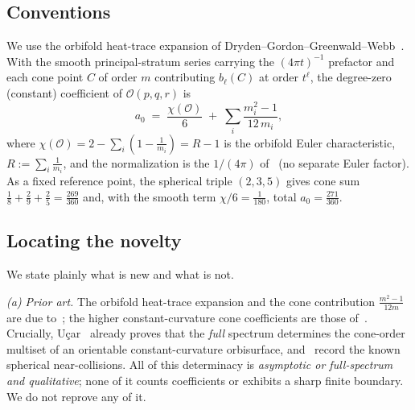 \documentclass[12pt, letterpaper]{article}
\theoremstyle{definition}
\theoremstyle{plain}
\begin{document}
\subsection{Conventions}
\label{sec:conventions}

We use the orbifold heat-trace expansion of Dryden--Gordon--Greenwald--Webb~\cite{dggw2008}. With the smooth principal-stratum series carrying the $(4\pi t)^{-1}$ prefactor and each cone point $C$ of order $m$ contributing $b_\ell(C)$ at order $t^{\ell}$, the degree-zero (constant) coefficient of $\mathcal{O}(p,q,r)$ is
\begin{equation}
    a_0 \;=\; \frac{\chi(\mathcal{O})}{6} \;+\; \sum_{i}\frac{m_i^2-1}{12\,m_i},
    \label{eq:a0conv}
\end{equation}
where $\chi(\mathcal{O}) = 2 - \sum_i(1-\tfrac1{m_i}) = R-1$ is the orbifold Euler characteristic, $R:=\sum_i \tfrac1{m_i}$, and the normalization is the $1/(4\pi)$ of~\cite{dggw2008} (no separate Euler factor). As a fixed reference point, the spherical triple $(2,3,5)$ gives cone sum $\tfrac18+\tfrac29+\tfrac25=\tfrac{269}{360}$ and, with the smooth term $\chi/6=\tfrac1{180}$, total $a_0=\tfrac{271}{360}$.

\subsection{Locating the novelty}
\label{sec:novelty}

We state plainly what is new and what is not.

\emph{(a) Prior art.} The orbifold heat-trace expansion and the cone contribution $\tfrac{m^2-1}{12m}$ are due to~\cite{donnelly1976, dggw2008}; the higher constant-curvature cone coefficients are those of~\cite{dggw2008, schueth2019, ucar2017}. Crucially, U\c{c}ar~\cite{ucar2017} already proves that the \emph{full} spectrum determines the cone-order multiset of an orientable constant-curvature orbisurface, and~\cite{dggw2008, ucar2017} record the known spherical near-collisions. All of this determinacy is \emph{asymptotic or full-spectrum and qualitative}; none of it counts coefficients or exhibits a sharp finite boundary. We do not reprove any of it.
\end{document}
